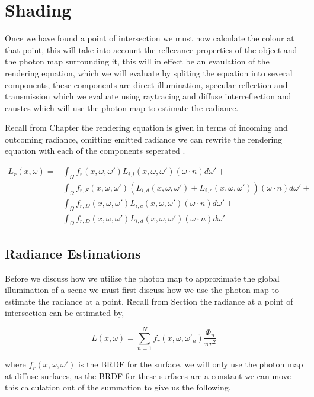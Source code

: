 \section{Shading}
Once we have found a point of intersection we must now calculate the colour at that point, this will take into account the
reflecance properties of the object and the photon map surrounding it, this will in effect be an evaulation of the rendering
equation, which we will evaluate by spliting the equation into several components, these components are direct illumination,
specular reflection and transmission which we evaluate using raytracing and diffuse interreflection and caustcs which will
use the photon map to estimate the radiance.

Recall from Chapter  the rendering equation is given in terms of incoming and outcoming radiance, omitting
emitted radiance we can rewrite the rendering equation with each of the components seperated .

\begin{align*}
L_{r}(x, \omega) =&
			\int_{\Omega}
				f_{r}(x, \omega, \omega')
				L_{i,l}(x,\omega,\omega')
				(\omega \cdot n)d\omega'
			+\\
		&	\int_{\Omega}
				f_{r,S}(x, \omega, \omega')
				(
				L_{i,d}(x,\omega,\omega')
				+
				L_{i,c}(x,\omega,\omega')
				)
				(\omega \cdot n)d\omega'
			+\\
		&	\int_{\Omega}
				f_{r,D}(x, \omega, \omega')
				L_{i,c}(x,\omega,\omega')
				(\omega \cdot n)d\omega'
			+\\
		&	\int_{\Omega}
				f_{r,D}(x, \omega, \omega')
				L_{i,d}(x,\omega,\omega')
				(\omega \cdot n)d\omega'
\end{align*}

\subsection{Radiance Estimations}
Before we discuss how we utilise the photon map to approximate the global illumination of a scene we must first discuss how
we use the photon map to estimate the radiance at a point. Recall from Section  the radiance at a point
of intersection can be estimated by,

\begin{equation}
L(x, \omega) = \sum\limits_{n = 1}^N f_r(x,\omega,\omega'_n) \frac{\Phi_n}{\pi r ^ 2}
\end{equation}

where $f_r(x, \omega,\omega')$ is the BRDF for the surface, we will only use the photon map at diffuse surfaces, as the BRDF
for these surfaces are a constant we can move this calculation out of the summation to give us the following.

